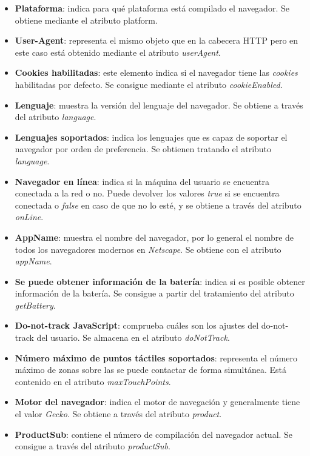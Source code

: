 \begin{itemize}
    \item \textbf{Plataforma}: indica para qué plataforma está compilado el navegador. Se obtiene mediante el atributo platform.
    \item \textbf{User-Agent}: representa el mismo objeto que en la cabecera HTTP pero en este caso está obtenido mediante el atributo \textit{userAgent}.
    \item \textbf{Cookies habilitadas}: este elemento indica si el navegador tiene las \textit{cookies} habilitadas por defecto. Se consigue mediante el atributo \textit{cookieEnabled}.
    \item \textbf{Lenguaje}: muestra la versión del lenguaje del navegador. Se obtiene a través del atributo \textit{language}. 
    \item \textbf{Lenguajes soportados}: indica los lenguajes que es capaz de soportar el navegador por orden de preferencia. Se obtienen tratando el atributo \textit{language}. 
    \item \textbf{Navegador en línea}: indica si la máquina del usuario se encuentra conectada a la red o no. Puede devolver los valores \textit{true} si se encuentra conectada o \textit{false} en caso de que no lo esté, y se obtiene a través del atributo \textit{onLine}.
    \item \textbf{AppName}: muestra el nombre del navegador, por lo general el nombre de todos los navegadores modernos en \textit{Netscape}. Se obtiene con el atributo \textit{appName}.
    \item \textbf{Se puede obtener información de la batería}: indica si es posible obtener información de la batería. Se consigue a partir del tratamiento del atributo \textit{getBattery}. 
    \item \textbf{Do-not-track JavaScript}: comprueba cuáles son los ajustes del do-not-track del usuario. Se almacena en el atributo \textit{doNotTrack}. 
    \item \textbf{Número máximo de puntos táctiles soportados}: representa el número máximo de zonas sobre las se puede contactar de forma simultánea. Está contenido en el atributo \textit{maxTouchPoints}. 
    \item \textbf{Motor del navegador}: indica el motor de navegación y generalmente tiene el valor \textit{Gecko}. Se obtiene a través del atributo \textit{product}. 
    \item \textbf{ProductSub}: contiene el número de compilación del navegador actual. Se consigue a través del atributo \textit{productSub}. 

\end{itemize}
